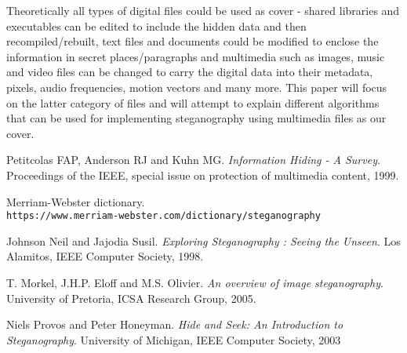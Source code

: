 \begin{multicols*}{2}
Theoretically all types of digital files could be used as cover  - shared libraries and executables can be edited to include the hidden data and then recompiled/rebuilt, text files and documents could be modified to enclose the information in secret places/paragraphs and multimedia such as images, music and video files can be changed to carry the digital data into their metadata, pixels, audio frequencies, motion vectors and many more. This paper will focus on the latter category of files and will attempt to explain different algorithms that can be used for implementing steganography using multimedia files as our cover.
\end{multicols*}


\begin{thebibliography}{9}
Petitcolas FAP, Anderson RJ and Kuhn MG.
\textit{Information Hiding - A Survey}.
Proceedings of the IEEE, special issue on protection of multimedia content, 1999.

Merriam-Webster dictionary.
\\\texttt{https://www.merriam-webster.com/dictionary/steganography}

Johnson Neil and Jajodia Susil.
\textit{Exploring Steganography : Seeing the Unseen}. 
Los Alamitos, IEEE Computer Society, 1998.

T. Morkel, J.H.P. Eloff and M.S. Olivier. 
\textit{An overview of image steganography}.
University of Pretoria, ICSA Research Group, 2005.

Niels Provos and Peter Honeyman.
\textit{Hide and Seek: An Introduction to Steganography}.
University of Michigan, IEEE Computer Society, 2003

\end{thebibliography}

